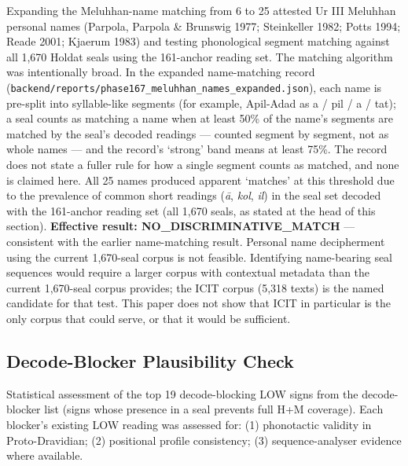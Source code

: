 \documentclass[11pt]{article}
\newcounter{none} %
\begin{document}
Expanding the Meluhhan-name matching from 6 to 25 attested Ur III Meluhhan personal
names (Parpola, Parpola \& Brunswig 1977; Steinkeller 1982; Potts 1994; Reade 2001; Kjaerum 1983) and testing phonological segment matching against all
1,670 Holdat seals using the 161-anchor reading set. The matching algorithm was intentionally broad. In the expanded name-matching record (\texttt{backend/\allowbreak reports/\allowbreak phase167\_meluhhan\_names\_expanded.json}), each name is pre-split into syllable-like segments (for example, Apil-Adad as a / pil / a / tat); a seal counts as matching a name when at least 50\% of the name's segments are matched by the seal's decoded readings --- counted segment by segment, not as whole names --- and the record's `strong' band means at least 75\%. The record does not state a fuller rule for how a single segment counts as matched, and none is claimed here. All 25 names produced apparent `matches' at this threshold due to the prevalence of common short readings (\emph{ā}, \emph{kol}, \emph{il}) in the seal set decoded with the 161-anchor reading set (all 1,670 seals, as stated at the head of this section). \textbf{Effective
result: NO\_DISCRIMINATIVE\_MATCH} --- consistent with the earlier name-matching result.
Personal name decipherment using the current 1,670-seal corpus is not
feasible. Identifying name-bearing seal sequences would require a larger corpus
with contextual metadata than the current 1,670-seal corpus provides;
the ICIT corpus (5,318 texts) is the named candidate for that test. This
paper does not show that ICIT in particular is the only corpus that
could serve, or that it would be sufficient.

\subsection{Decode-Blocker Plausibility Check }\label{decode-blocker-statistical-analysis-phase-168}

Statistical assessment of the top 19 decode-blocking LOW signs from
the decode-blocker list (signs whose presence in a seal prevents full H+M coverage). Each
blocker's existing LOW reading was assessed for: (1) phonotactic
validity in Proto-Dravidian; (2) positional profile consistency;
(3) sequence-analyser evidence where available.
\end{document}

